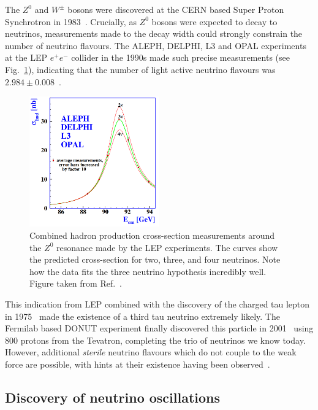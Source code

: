 The $Z^{0}$ and $W^{\pm}$ bosons were discovered at the CERN based Super Proton Synchrotron in
1983~\cite{arnison1983_z, arnison1983_w}. Crucially, as $Z^{0}$ bosons were expected to decay to
neutrinos, measurements made to the decay width could strongly constrain the number of neutrino
flavours. The ALEPH, DELPHI, L3 and OPAL experiments at the LEP $e^{+}e^{-}$ collider in the 1990s
made such precise measurements (see Fig.~\ref{fig:z_resonance}), indicating that the number of
light active neutrino flavours was $2.984\pm0.008$~\cite{electroweak2006}.

\begin{figure} %
    \includegraphics[origin=c,width=0.5\textwidth]{diagrams/3-theory/z_resonance.png}
    \caption[Hadron production cross-section measurements from LEP]
    {Combined hadron production cross-section measurements around the $Z^{0}$ resonance made by
        the LEP experiments. The curves show the predicted cross-section for two, three, and four
        neutrinos. Note how the data fits the three neutrino hypothesis incredibly well. Figure
        taken from Ref.~\cite{electroweak2006}.}
    \label{fig:z_resonance}
\end{figure}

This indication from LEP combined with the discovery of the charged tau lepton in
1975~\cite{perl1975} made the existence of a third tau neutrino extremely likely. The Fermilab
based DONUT experiment finally discovered this particle in 2001~\cite{Kodama2001} using
\unit{800}{\GeV} protons from the Tevatron, completing the trio of neutrinos we know today.
However, additional \emph{sterile} neutrino flavours which do not couple to the weak force are
possible, with hints at their existence having been observed~\cite{particle2020}.

\subsection{Discovery of neutrino oscillations} %
\label{sec:theory_history_osc} %

